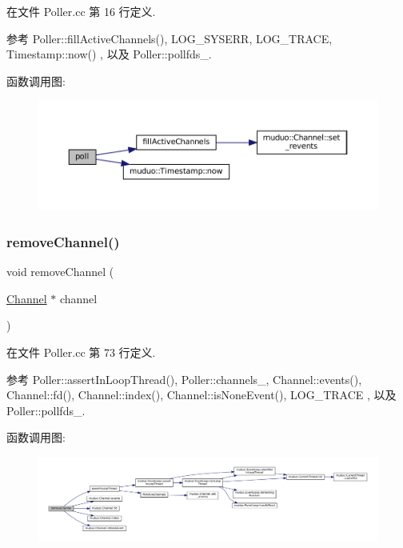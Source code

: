 在文件 Poller.\+cc 第 16 行定义.



参考 Poller\+::fill\+Active\+Channels(), L\+O\+G\+\_\+\+S\+Y\+S\+E\+RR, L\+O\+G\+\_\+\+T\+R\+A\+CE, Timestamp\+::now() , 以及 Poller\+::pollfds\+\_\+.

函数调用图\+:
\nopagebreak
\begin{figure}[H]
\begin{center}
\leavevmode
\includegraphics[width=350pt]{classmuduo_1_1Poller_a0165aabf2721e39f87ad67b05ece9267_cgraph}
\end{center}
\end{figure}
\mbox{\label{classmuduo_1_1Poller_ab10f76c92cb5269f8296e5b3e4dd0ef9}} 
\subsubsection{\texorpdfstring{remove\+Channel()}{removeChannel()}}
{\footnotesize\ttfamily void remove\+Channel (\begin{DoxyParamCaption}\item[{\hyperlink{classmuduo_1_1Channel}{Channel} $\ast$}]{channel }\end{DoxyParamCaption})}



在文件 Poller.\+cc 第 73 行定义.



参考 Poller\+::assert\+In\+Loop\+Thread(), Poller\+::channels\+\_\+, Channel\+::events(), Channel\+::fd(), Channel\+::index(), Channel\+::is\+None\+Event(), L\+O\+G\+\_\+\+T\+R\+A\+CE , 以及 Poller\+::pollfds\+\_\+.

函数调用图\+:
\nopagebreak
\begin{figure}[H]
\begin{center}
\leavevmode
\includegraphics[width=350pt]{classmuduo_1_1Poller_ab10f76c92cb5269f8296e5b3e4dd0ef9_cgraph}
\end{center}
\end{figure}
\mbox{\label{classmuduo_1_1Poller_acaa4a191936aacf608d279a6f343d533}} 
